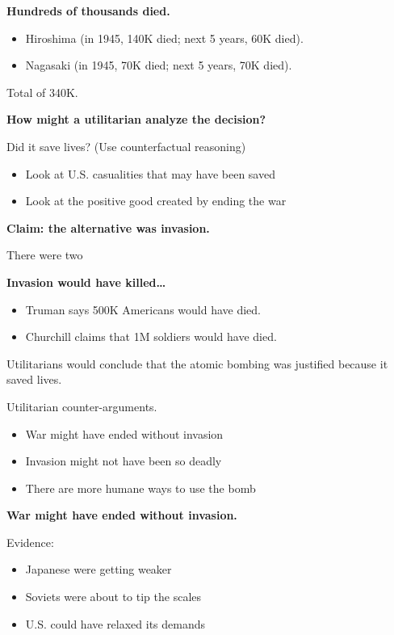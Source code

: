 \documentclass{article}
\begin{document}
{\bf Hundreds of thousands died.}

\begin{itemize}
  \item Hiroshima (in 1945, 140K died; next 5 years, 60K died).
  \item Nagasaki (in 1945, 70K died; next 5 years, 70K died).
\end{itemize}

Total of 340K.

{\bf How might a utilitarian analyze the decision?}

Did it save lives? (Use counterfactual reasoning)

\begin{itemize}
  \item Look at U.S. casualities that may have been saved
  \item Look at the positive good created by ending the war
\end{itemize}

{\bf Claim: the alternative was invasion.}

There were two 

{\bf Invasion would have killed\ldots}

\begin{itemize}
  \item Truman says 500K Americans would have died.
  \item Churchill claims that 1M soldiers would have died.
\end{itemize}

Utilitarians would conclude that the atomic bombing was justified because it saved lives.

Utilitarian counter-arguments.

\begin{itemize}
  \item War might have ended without invasion
  \item Invasion might not have been so deadly
  \item There are more humane ways to use the bomb
\end{itemize}

{\bf War might have ended without invasion.}

Evidence:
\begin{itemize}
  \item Japanese were getting weaker
  \item Soviets were about to tip the scales
  \item U.S. could have relaxed its demands
\end{itemize}
\end{document}

